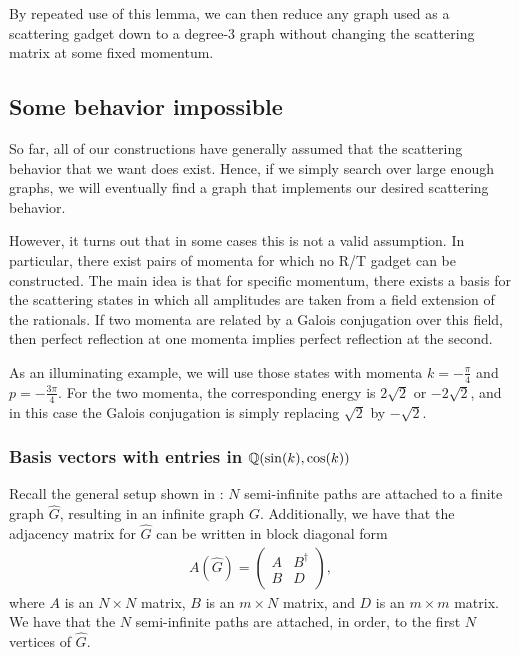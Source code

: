 \documentclass[../thesis-main/thesis-main]{subfiles}
\begin{document}
By repeated use of this lemma, we can then reduce any graph used as a scattering gadget down to a degree-3 graph without changing the scattering matrix at some fixed momentum.



\subsection{Some behavior impossible}

So far, all of our constructions have generally assumed that the scattering behavior that we want does exist.  Hence, if we simply search over large enough graphs, we will eventually find a graph that implements our desired scattering behavior.

However, it turns out that in some cases this is not a valid assumption.  In particular, there exist pairs of momenta for which no R/T gadget can be constructed.  The main idea is that for specific momentum, there exists a basis for the scattering states in which all amplitudes are taken from a field extension of the rationals.  If two momenta are related by a Galois conjugation over this field, then perfect reflection at one momenta implies perfect reflection at the second.  

As an illuminating example, we will use those states with momenta $k= -\frac{\pi}{4}$ and $p = - \frac{3\pi}{4}$.  For the two momenta, the corresponding energy is $2 \sqrt{2}$ or $-2\sqrt{2}$, and in this case the Galois conjugation is simply replacing $\sqrt{2}$ by $-\sqrt{2}$. 


\subsubsection{Basis vectors with entries in $\mathbb{Q}(\sin(k),\cos(k))$}
\label{sec:vecs_over_field}

Recall the general setup shown in : $N$ semi-infinite paths are attached to a finite graph $\widehat G$, resulting in an infinite graph $G$.  Additionally, we have that the adjacency matrix for $\widehat{G}$ can be written in block diagonal form
\begin{align}
  A(\widehat{G}) = \begin{pmatrix} 
    A & B^\dag\\
    B & D
  \end{pmatrix},
\end{align}
where $A$ is an $N\times N$ matrix, $B$ is an $m\times N$ matrix, and $D$ is an $m\times m$ matrix.  We have that the $N$ semi-infinite paths are attached, in order, to the first $N$ vertices of $\widehat{G}$.
\end{document}
